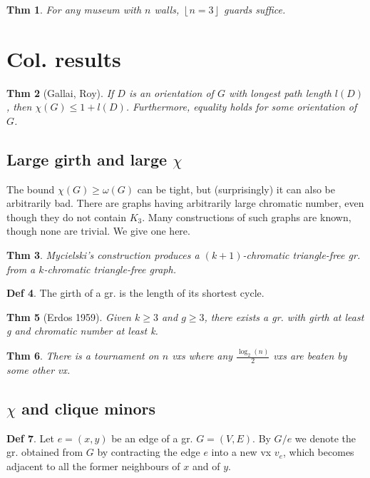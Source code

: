 \documentclass[11pt, fleqn, a4paper, landscape]{article}
\theoremstyle{plain} %
\newtheorem{thm}{Thm}
\theoremstyle{remark} %
\theoremstyle{definition} %
\newtheorem{defi}[thm]{Def}
\begin{document}
\begin{multicols}{5}
\begin{thm}
For any museum with $n$ walls, $\left\lfloor n=3\right\rfloor$ guards suffice.
\end{thm}

\section{Col. results}
\begin{thm}[Gallai, Roy]
If $D$ is an orientation of $G$ with longest path length $l(D)$, then $\chi(G) \le 1 + l(D)$. Furthermore, equality holds for some orientation of $G$.
\end{thm} 

\subsection{Large girth and large $\chi$}

The bound $\chi(G) \ge \omega(G)$ can be tight, but (surprisingly) it can also be arbitrarily bad. There are graphs having arbitrarily large chromatic number, even though they do not contain $K_3$. Many constructions of such graphs are known, though none are trivial. We give one here.
\addtocounter{thm}{1}
\begin{thm}
Mycielski’s construction produces a $(k + 1)$-chromatic triangle-free gr. from a $k$-chromatic triangle-free graph.
\end{thm}

\begin{defi}
The girth of a gr. is the length of its shortest cycle.
\end{defi}
\begin{thm}[Erdos 1959]
Given $k \ge 3$ and $g \ge 3$, there exists a gr. with girth at least g and
chromatic number at least k.
\end{thm} 
\addtocounter{thm}{2}
\begin{thm}
There is a tournament on $n$ vxs where any $\frac{\log_2(n)}{2}$ vxs are beaten by some other vx.
\end{thm}
\subsection{$\chi$ and clique minors}
\begin{defi}
Let $e = (x, y)$ be an edge of a gr. $G = (V,E)$. By $G\slash e$ we denote the gr. obtained from $G$ by contracting the edge $e$ into a new vx $v_e$, which becomes adjacent to all the former neighbours of $x$ and of $y$. 


\end{defi}
\end{multicols}
\end{document}
